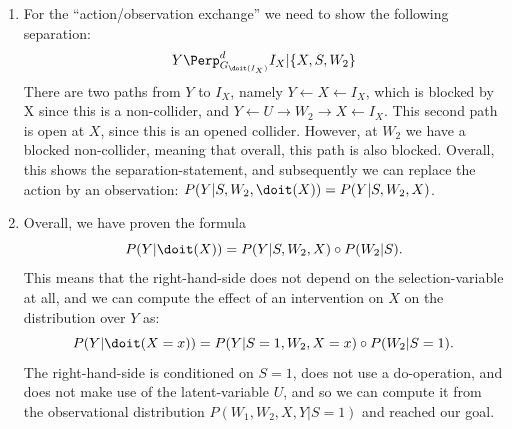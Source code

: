 \begin{enumerate}[label=8.\arabic*]
\begin{gradedsolution}
\begin{enumerate}
            \item {} For the ``action/observation exchange'' we need to show the following separation:
            \begin{equation*}
                Y \Perp_{G_{\doit(I_X)}}^d I_X | \{X, S, W_2\}
            \end{equation*}
            There are two paths from $Y$ to $I_X$, namely $Y \leftarrow X \leftarrow I_X$, which is blocked by X since this is a non-collider, and $Y \leftarrow U \rightarrow W_2 \rightarrow X \leftarrow I_X$.
            This second path is open at $X$, since this is an opened collider. However, at $W_2$ we have a blocked non-collider, meaning that overall, this path is also blocked.
            Overall, this shows the separation-statement, and subsequently we can replace the action by an observation: $P(Y | S, W_2, \doit(X)) = P(Y | S, W_2, X) $.
            \item {} Overall, we have proven the formula
            \begin{equation*}
                P(Y | \doit(X)) = P(Y | S, W_2, X) \circ P(W_2 | S).
            \end{equation*}
            This means that the right-hand-side does not depend on the selection-variable at all, and we can compute the effect of an intervention on $X$ on the distribution over $Y$ as:
            \begin{equation*}
                P(Y | \doit(X = x)) = P(Y | S = 1, W_2, X = x) \circ P(W_2 | S = 1).
            \end{equation*}
            The right-hand-side is conditioned on $S=1$, does not use a do-operation, and does not make use of the latent-variable $U$, and so we can compute it from the observational distribution $P(W_1, W_2, X, Y | S=1)$ and reached our goal.
        \end{enumerate}
    \end{gradedsolution}

\end{enumerate}


